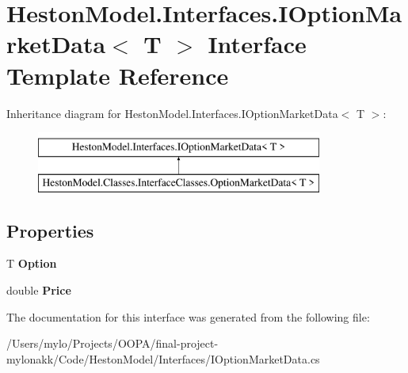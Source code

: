 \hypertarget{interface_heston_model_1_1_interfaces_1_1_i_option_market_data}{}\section{Heston\+Model.\+Interfaces.\+I\+Option\+Market\+Data$<$ T $>$ Interface Template Reference}
\label{interface_heston_model_1_1_interfaces_1_1_i_option_market_data}
Inheritance diagram for Heston\+Model.\+Interfaces.\+I\+Option\+Market\+Data$<$ T $>$\+:\begin{figure}[H]
\begin{center}
\leavevmode
\includegraphics[height=2.000000cm]{interface_heston_model_1_1_interfaces_1_1_i_option_market_data}
\end{center}
\end{figure}
\subsection*{Properties}
\begin{DoxyCompactItemize}
\item 
\mbox{\label{interface_heston_model_1_1_interfaces_1_1_i_option_market_data_a884b4ceea736940a7cad584fbc6e0bfe}} 
T {\bfseries Option}
\item 
\mbox{\label{interface_heston_model_1_1_interfaces_1_1_i_option_market_data_ad8843a86f23ad6f0b864531ab5cdebde}} 
double {\bfseries Price}
\end{DoxyCompactItemize}


The documentation for this interface was generated from the following file\+:\begin{DoxyCompactItemize}
\item 
/\+Users/mylo/\+Projects/\+O\+O\+P\+A/final-\/project-\/mylonakk/\+Code/\+Heston\+Model/\+Interfaces/I\+Option\+Market\+Data.\+cs\end{DoxyCompactItemize}
